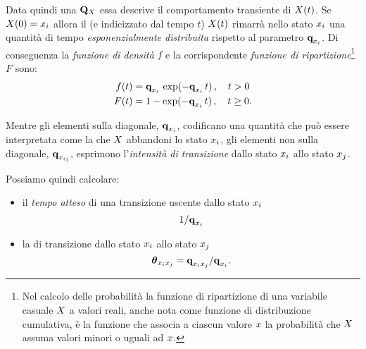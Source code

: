 Data quindi una \im*{} $\mathbf{Q}_{\mathnormal{X}}$ essa descrive il comportamento transiente di $\mathnormal{X}(t)$. Se $\mathnormal{X}(0)=\mathnormal{x}_i$ allora il \mprocess*{} \omog*{} (e indicizzato dal tempo $t$) $\mathnormal{X}(t)$ rimarrà nello stato $\mathnormal{x}_i$ una quantità di tempo \emph{esponenzialmente distribuita} rispetto al parametro $\boldsymbol{\textbf{\text{q}}}_{\mathnormal{x}_i}$. Di conseguenza la \emph{funzione di densità} $f$ e la corrispondente \emph{funzione di ripartizione}\footnote{Nel calcolo delle probabilità la funzione di ripartizione di una variabile casuale $\mathnormal{X}$ a valori reali, anche nota come funzione di distribuzione cumulativa, è la funzione che associa a ciascun valore $\mathnormal{x}$ la probabilità che $\mathnormal{X}$ assuma valori minori o uguali ad $\mathnormal{x}$.} $F$ sono:
\begin{equation}
\label{eq:im-distrib}
\begin{split}
f(t) &= \boldsymbol{\textbf{\text{q}}}_{\mathnormal{x}_i}\,\exp(-\boldsymbol{\textbf{\text{q}}}_{\mathnormal{x}_i}\,t)\,,\quad t>0 \\
F(t) &= 1-\exp(-\boldsymbol{\textbf{\text{q}}}_{\mathnormal{x}_i}\,t)\,,\quad t\geq0\text{.}
\end{split}
\end{equation}

Mentre gli elementi sulla diagonale, $\boldsymbol{\textbf{\text{q}}}_{\mathnormal{x}_i}$, codificano una quantità che può essere interpretata come la \emph{} che $\mathnormal{X}$ abbandoni lo stato $\mathnormal{x}_i$, gli elementi non sulla diagonale, $\boldsymbol{\textbf{\text{q}}}_{\mathnormal{x}_{ij}}$, esprimono l'\emph{intensità di transizione} dallo stato $\mathnormal{x}_i$ allo stato $\mathnormal{x}_j$.

Possiamo quindi calcolare:
\begin{itemize}
    \item il \emph{tempo atteso} di una transizione uscente dallo stato $\mathnormal{x}_i$ \[1/\boldsymbol{\textbf{\text{q}}}_{\mathnormal{x}_i}\]
    \item la \emph{} di transizione dallo stato $\mathnormal{x}_i$ allo stato $\mathnormal{x}_j$ \[\boldsymbol{\textbf{\text{$\theta$}}}_{\mathnormal{x}_i\mathnormal{x}_j}=\boldsymbol{\textbf{\text{q}}}_{\mathnormal{x}_i\mathnormal{x}_j}/\boldsymbol{\textbf{\text{q}}}_{\mathnormal{x}_i}\text{.}\]
\end{itemize}

